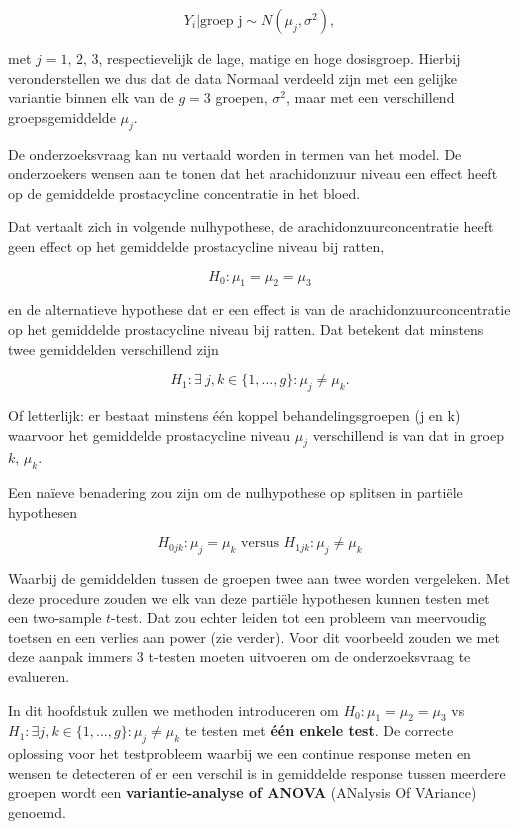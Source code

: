 \documentclass[
  12pt,dutch,coursenotes]{book}
\theoremstyle{definition}
\theoremstyle{definition}
\theoremstyle{definition}
\theoremstyle{remark}
\begin{document}
\[Y_i \vert \text{groep j} \sim N(\mu_j,\sigma^2),\]

met \(j= \text{1, 2, 3}\), respectievelijk de lage, matige en hoge dosisgroep. Hierbij veronderstellen we dus dat de data Normaal verdeeld zijn met een gelijke variantie binnen elk van de \(g=3\) groepen, \(\sigma^2\), maar met een verschillend groepsgemiddelde \(\mu_j\).

De onderzoeksvraag kan nu vertaald worden in termen van het model.
De onderzoekers wensen aan te tonen dat het arachidonzuur niveau een effect heeft op de gemiddelde prostacycline concentratie in het bloed.

Dat vertaalt zich in volgende nulhypothese, de arachidonzuurconcentratie heeft geen effect op het gemiddelde prostacycline niveau bij ratten,

\[H_0:\mu_1=\mu_2 = \mu_3\]

en de alternatieve hypothese dat er een effect is van de arachidonzuurconcentratie op het gemiddelde prostacycline niveau bij ratten. Dat betekent dat minstens twee gemiddelden verschillend zijn

\[H_1: \exists\ j,k \in \{1,\ldots,g\} : \mu_j\neq\mu_k.\]

Of letterlijk: er bestaat minstens één koppel behandelingsgroepen (j en k) waarvoor het gemiddelde prostacycline niveau \(\mu_j\) verschillend is van dat in groep \(k\), \(\mu_k\).

Een naïeve benadering zou zijn om de nulhypothese op splitsen in partiële hypothesen

\[H_{0jk}: \mu_j=\mu_k \text{ versus } H_{1jk}: \mu_j \neq \mu_k\]

Waarbij de gemiddelden tussen de groepen twee aan twee worden vergeleken.
Met deze procedure zouden we elk van deze partiële hypothesen kunnen testen met een two-sample \(t\)-test.
Dat zou echter leiden tot een probleem van meervoudig toetsen en een verlies aan power (zie verder).
Voor dit voorbeeld zouden we met deze aanpak immers 3 t-testen moeten uitvoeren om de onderzoeksvraag te evalueren.

In dit hoofdstuk zullen we methoden introduceren om \(H_0:\mu_1=\mu_2=\mu_3\) vs \(H_1: \exists j,k \in \{1,\ldots,g\} : \mu_j\neq\mu_k\) te testen met \textbf{één enkele test}.
De correcte oplossing voor het testprobleem waarbij we een continue response meten en wensen te detecteren of er een verschil is in gemiddelde response tussen meerdere groepen wordt een \textbf{variantie-analyse of ANOVA} (ANalysis Of VAriance) genoemd.
\end{document}
